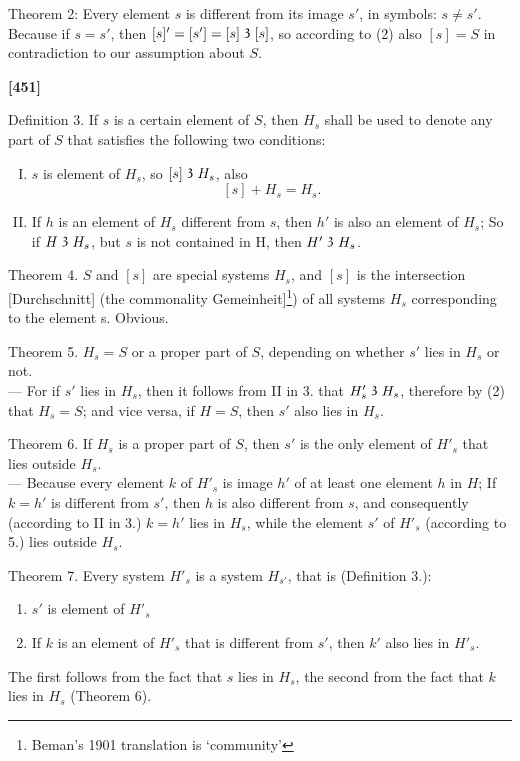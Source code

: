 \documentclass[leqno]{article}
\newcommand\partof{\mathrel{\raisebox{0.45ex}{$\mathfrak{3}$}}}
\begin{document}
Theorem 2: Every element $s$ is different from its image $s'$, in symbols: $s \neq s'$. 
Because if $s = s'$, then $[s]' = [s'] = [s] \partof [s]$, so according to (2) also $[s] = S$ in contradiction to our assumption about $S$.

\textbf{[451]}

Definition 3. If $s$ is a certain element of $S$, then $H_s$ shall be used to denote any part of $S$ that satisfies the following two conditions:
\begin{enumerate}[I.]
\item $s$ is element of $H_s$, so $[s] \partof H_s$, also 
\[
	[s] + H_s = H_s.
\]
\item If $h$ is an element of $H_s$ different from $s$, then $h'$ is also an element of $H_s$; So if $H \partof H_s$, but $s$ is not contained in H, then $H' \partof H_s$.
\end{enumerate}
Theorem 4. $S$ and $[s]$ are special systems $H_s$, and $[s]$ is the intersection [Durchschnitt] (the commonality Gemeinheit]\footnote{Beman's 1901 translation is `community'}) of all systems $H_s$ corresponding to the element s. Obvious.

Theorem 5. $H_s = S$ or a proper part of $S$, depending on whether $s'$ lies in $H_s$ or not.\\
--- For if $s'$ lies in $H_s$, then it follows from II in 3. that $H'_s \partof H_s$, therefore by (2) that $H_s = S$; and vice versa, if $H = S$, then $s'$ also lies in $H_s$.

Theorem 6. If $H_s$ is a proper part of $S$, then $s'$ is the only element of $H'_s$ that lies outside $H_s$. \\
--- Because every element $k$ of $H'_s$ is image $h'$ of at least one element $h$ in $H$; 
If $k=h'$ is different from $s'$, then $h$ is also different from $s$, and consequently (according to II in 3.) $k = h'$ lies in $H_s$, while the element $s'$ of $H'_s$ (according to 5.) lies outside $H_s$.

Theorem 7. Every system $H'_s$ is a system $H_{s'}$, that is (Definition 3.):
\begin{enumerate}[I'.]
	\item $s'$ is element of $H'_s$
	\item If $k$ is an element of $H'_s$ that is different from $s'$, then $k'$ also lies in $H'_s$.
\end{enumerate}

The first follows from the fact that $s$ lies in $H_s$, the second from the fact that $k$ lies in $H_s$ (Theorem 6).
\end{document}
